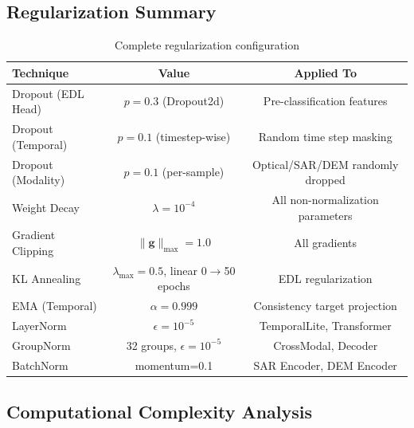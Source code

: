 \subsection{Regularization Summary}

\begin{table}[h]
\centering
\caption{Complete regularization configuration}
\begin{tabular}{lcc}
\toprule
\textbf{Technique} & \textbf{Value} & \textbf{Applied To} \\
\midrule
Dropout (EDL Head) & $p=0.3$ (Dropout2d) & Pre-classification features \\
Dropout (Temporal) & $p=0.1$ (timestep-wise) & Random time step masking \\
Dropout (Modality) & $p=0.1$ (per-sample) & Optical/SAR/DEM randomly dropped \\
Weight Decay & $\lambda=10^{-4}$ & All non-normalization parameters \\
Gradient Clipping & $\|\mathbf{g}\|_{\max}=1.0$ & All gradients \\
KL Annealing & $\lambda_{\max}=0.5$, linear 0$\to$50 epochs & EDL regularization \\
EMA (Temporal) & $\alpha=0.999$ & Consistency target projection \\
LayerNorm & $\epsilon=10^{-5}$ & TemporalLite, Transformer \\
GroupNorm & 32 groups, $\epsilon=10^{-5}$ & CrossModal, Decoder \\
BatchNorm & momentum=0.1 & SAR Encoder, DEM Encoder \\
\bottomrule
\end{tabular}
\end{table}

\subsection{Computational Complexity Analysis}

